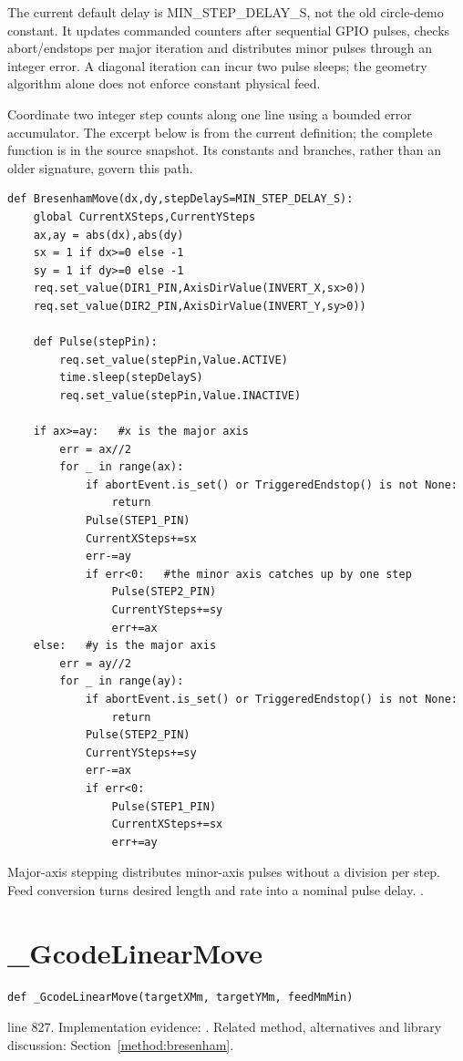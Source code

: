 The current default delay is MIN\_STEP\_DELAY\_S, not the old circle-demo constant. It updates commanded counters after sequential GPIO pulses, checks abort/endstops per major iteration and distributes minor pulses through an integer error. A diagonal iteration can incur two pulse sleeps; the geometry algorithm alone does not enforce constant physical feed.


Coordinate two integer step counts along one line using a bounded error accumulator. The excerpt below is from the current definition; the complete function is in the source snapshot. Its constants and branches, rather than an older signature, govern this path.


\begin{lstlisting}[style=plain]
def BresenhamMove(dx,dy,stepDelayS=MIN_STEP_DELAY_S):
    global CurrentXSteps,CurrentYSteps
    ax,ay = abs(dx),abs(dy)
    sx = 1 if dx>=0 else -1
    sy = 1 if dy>=0 else -1
    req.set_value(DIR1_PIN,AxisDirValue(INVERT_X,sx>0))
    req.set_value(DIR2_PIN,AxisDirValue(INVERT_Y,sy>0))

    def Pulse(stepPin):
        req.set_value(stepPin,Value.ACTIVE)
        time.sleep(stepDelayS)
        req.set_value(stepPin,Value.INACTIVE)

    if ax>=ay:   #x is the major axis
        err = ax//2
        for _ in range(ax):
            if abortEvent.is_set() or TriggeredEndstop() is not None:
                return
            Pulse(STEP1_PIN)
            CurrentXSteps+=sx
            err-=ay
            if err<0:   #the minor axis catches up by one step
                Pulse(STEP2_PIN)
                CurrentYSteps+=sy
                err+=ax
    else:   #y is the major axis
        err = ay//2
        for _ in range(ay):
            if abortEvent.is_set() or TriggeredEndstop() is not None:
                return
            Pulse(STEP2_PIN)
            CurrentYSteps+=sy
            err-=ax
            if err<0:
                Pulse(STEP1_PIN)
                CurrentXSteps+=sx
                err+=ay
\end{lstlisting}
Major-axis stepping distributes minor-axis pulses without a division per step. Feed conversion turns desired length and rate into a nominal pulse delay. \cite{bresenham1965,a4988datasheet,kernelgpio}.


\section{\_GcodeLinearMove}\label{fn:reproduce:-GcodeLinearMove}
\begin{lstlisting}[style=sig]
def _GcodeLinearMove(targetXMm, targetYMm, feedMmMin)
\end{lstlisting}
 line 827. Implementation evidence: \cite{code2026}. Related method, alternatives and library discussion: Section~\ref{method:bresenham}.


